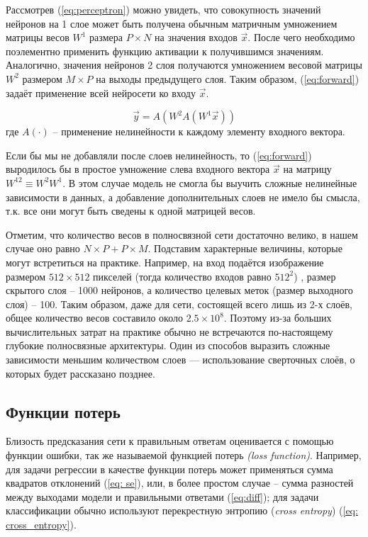 Рассмотрев (\ref{eq:perceptron}) можно увидеть, что 
совокупность значений нейронов на 1 слое может быть получена 
обычным матричным умножением матрицы весов
 $W^1$ размера $P \times N$ на значения входов $\vec{x}$.
После чего необходимо поэлементно применить 
функцию активации к получившимся значениям. Аналогично, значения нейронов
2 слоя получаются умножением весовой матрицы
$W^2$ размером $M \times P$ на выходы предыдущего слоя.
Таким образом, (\ref{eq:forward}) задаёт применение всей нейросети
ко входу $\vec{x}$.

\begin{equation}\label{eq:forward}
	   \vec{y} = A(W^{2} A(W^{1} \vec{x}))
\end{equation}
где $A(\cdot)$ -- применение нелинейности к каждому элементу входного 
вектора.

\indent
\indent
Если бы мы не добавляли после слоев нелинейность, то (\ref{eq:forward})
выродилось бы в простое умножение слева входного вектора $\vec{x}$ на матрицу
$W^{12} \equiv W^{2} W^{1}$. В этом случае модель не смогла бы выучить 
сложные нелинейные зависимости в данных, а добавление дополнительных слоев
не имело бы смысла, т.к. все они могут быть сведены к одной матрицей весов.

\indent
\indent
Отметим, что количество весов в полносвязной сети достаточно велико,
в нашем случае оно равно $N \times P + P \times M$. Подставим характерные
величины, которые могут встретиться на практике. Например, на 
вход подаётся изображение размером $512 \times 512$ пикселей (тогда
количество входов равно $512^2$) , размер скрытого слоя -- 1000 нейронов,
а количество целевых меток (размер выходного слоя) -- 100. Таким образом,
даже для сети, состоящей всего лишь из 2-х слоёв, общее
количество весов составило около $2.5 \times 10^8$. 
Поэтому из-за больших вычислительных затрат
на практике обычно не встречаются по-настоящему глубокие полносвязные архитектуры.
 Один из способов выразить сложные зависимости меньшим количеством слоев ---
 использование сверточных слоёв, о которых будет рассказано позднее.


\subsection{Функции потерь}
\label{section: losses}

\indent
\indent
Близость предсказания сети к правильным ответам оценивается
с помощью функции ошибки, так же называемой 
 функцией потерь \textit{(loss function)}. 
Например, для задачи регрессии в качестве функции потерь
может применяться сумма квадратов отклонений
 (\ref{eq: se}),
 или, в более простом случае -- сумма разностей между выходами модели
  и правильными ответами (\ref{eq:diff});
для задачи классификации обычно используют перекрестную энтропию 
(\textit{cross entropy}) (\ref{eq: cross_entropy}).


